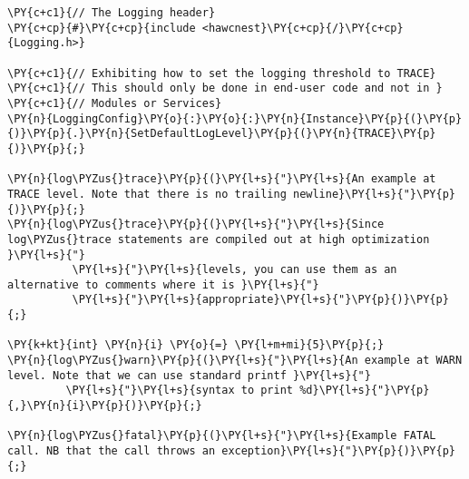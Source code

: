 \begin{Verbatim}[commandchars=\\\{\}]
\PY{c+c1}{// The Logging header}
\PY{c+cp}{#}\PY{c+cp}{include <hawcnest}\PY{c+cp}{/}\PY{c+cp}{Logging.h>}

\PY{c+c1}{// Exhibiting how to set the logging threshold to TRACE}
\PY{c+c1}{// This should only be done in end-user code and not in }
\PY{c+c1}{// Modules or Services}
\PY{n}{LoggingConfig}\PY{o}{:}\PY{o}{:}\PY{n}{Instance}\PY{p}{(}\PY{p}{)}\PY{p}{.}\PY{n}{SetDefaultLogLevel}\PY{p}{(}\PY{n}{TRACE}\PY{p}{)}\PY{p}{;}

\PY{n}{log\PYZus{}trace}\PY{p}{(}\PY{l+s}{"}\PY{l+s}{An example at TRACE level. Note that there is no trailing newline}\PY{l+s}{"}\PY{p}{)}\PY{p}{;}
\PY{n}{log\PYZus{}trace}\PY{p}{(}\PY{l+s}{"}\PY{l+s}{Since log\PYZus{}trace statements are compiled out at high optimization }\PY{l+s}{"}
          \PY{l+s}{"}\PY{l+s}{levels, you can use them as an alternative to comments where it is }\PY{l+s}{"}
          \PY{l+s}{"}\PY{l+s}{appropriate}\PY{l+s}{"}\PY{p}{)}\PY{p}{;}

\PY{k+kt}{int} \PY{n}{i} \PY{o}{=} \PY{l+m+mi}{5}\PY{p}{;}
\PY{n}{log\PYZus{}warn}\PY{p}{(}\PY{l+s}{"}\PY{l+s}{An example at WARN level. Note that we can use standard printf }\PY{l+s}{"}
         \PY{l+s}{"}\PY{l+s}{syntax to print %d}\PY{l+s}{"}\PY{p}{,}\PY{n}{i}\PY{p}{)}\PY{p}{;}

\PY{n}{log\PYZus{}fatal}\PY{p}{(}\PY{l+s}{"}\PY{l+s}{Example FATAL call. NB that the call throws an exception}\PY{l+s}{"}\PY{p}{)}\PY{p}{;}
\end{Verbatim}
